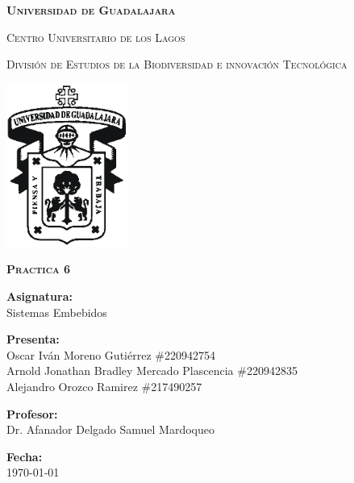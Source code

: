 \documentclass[12pt]{report}
\begin{document}
\setlength{\hoffset}{27 pt} %
\begin{titlepage}
{\centering
{\scshape\bfseries\fontsize{29.16}{34.992}\selectfont Universidad de Guadalajara \par}
\vspace{0.5cm}
{\scshape\Large Centro Universitario de los Lagos \par}
\vspace{1cm}
{\scshape\Large División de Estudios de la Biodiversidad e innovación Tecnológica \par}
\vspace{1cm}
{\graphicspath{{imagenes/Portada}} %
\includegraphics[width=0.3\textwidth]{image.png}\par}
\vspace{1cm}
{\scshape\large\bfseries Practica 6 \par}
\vspace{0.5cm}
{\large \textbf{Asignatura:} \\Sistemas Embebidos\par}
\vfill
{\large \textbf{Presenta:} \\Oscar Iván Moreno Gutiérrez \#220942754
\\Arnold Jonathan Bradley Mercado Plascencia \#220942835
\\Alejandro Orozco Ramirez \#217490257  \par}
\vfill
{\large \textbf{Profesor:} \\Dr. Afanador Delgado Samuel Mardoqueo \par}
\vfill
\vfill
\begin{flushright}
  {\normalsize \textbf {Fecha:} \\ \today}
\end{flushright}
\vfill}
{\large  \par}
\end{titlepage}
\end{document}
